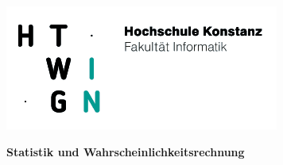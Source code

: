 \noindent
\begin{minipage}[t]{0.4\textwidth} 
\includegraphics[width=\linewidth]{htwg_logo.png}
\end{minipage}%
\hfill%
\begin{minipage}[t]{0.6\textwidth}\raggedleft
\textbf{\large Statistik und Wahrscheinlichkeitsrechnung}
\end{minipage}


